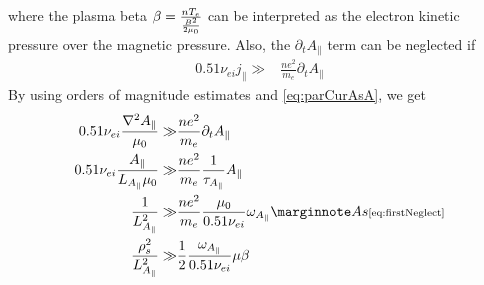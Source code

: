 %
where the plasma beta $\beta=\frac{nT_e}{\frac{B^2}{2\mu_0}}$ can be interpreted as the electron kinetic pressure over the magnetic pressure.
Also, the $\partial_t A_\|$ term can be neglected if
%
\begin{align*}
    0.51\nu_{ei}j_\|
    \gg &
    \frac{ne^2}{m_e}\partial_t A_\|
\end{align*}
%
By using orders of magnitude estimates and \cref{eq:parCurAsA}, we get
%
\begin{align*}
    0.51\nu_{ei}\frac{\grad^2 A_\|}{\mu_0}
    \gg &
    \frac{ne^2}{m_e}\partial_t A_\|
    \\
    0.51\nu_{ei}\frac{A_\|}{L_{A_\|}\mu_0}
    \gg &
    \frac{ne^2}{m_e}\frac{1}{\tau_{A_{\|}}} A_\|
    \\
    \frac{1}{L^2_{A_\|}}
    \gg &
    \frac{ne^2}{m_e}\frac{\mu_0}{0.51\nu_{ei}}\om_{A_{\|}}
    \note{As \cref{eq:firstNeglect}}
    \\
    \frac{\rho_s^2}{L^2_{A_\|}}
    \gg &
    \frac{1}{2}\frac{\om_{A_{\|}}}{0.51\nu_{ei}}\mu
    \b
\end{align*}
%
